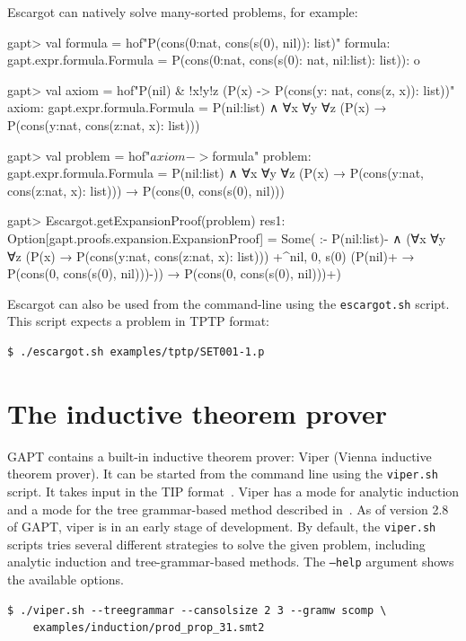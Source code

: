 \documentclass[a4paper,11pt]{book}
\newcommand{\cli}[1]{{\ttfamily {#1}}}
\begin{document}
Escargot can natively solve many-sorted problems, for example:
\begin{clilisting}
gapt> val formula = hof"P(cons(0:nat, cons(s(0), nil)): list)"
formula: gapt.expr.formula.Formula = P(cons(0:nat, cons(s(0): nat, nil:list): list)): o

gapt> val axiom = hof"P(nil) & !x!y!z (P(x) -> P(cons(y: nat, cons(z, x)): list))"
axiom: gapt.expr.formula.Formula = P(nil:list) ∧ ∀x ∀y ∀z (P(x) → P(cons(y:nat, cons(z:nat, x): list)))

gapt> val problem = hof"$axiom -> $formula"
problem: gapt.expr.formula.Formula =
P(nil:list) ∧ ∀x ∀y ∀z (P(x) → P(cons(y:nat, cons(z:nat, x): list))) →
  P(cons(0, cons(s(0), nil)))

gapt> Escargot.getExpansionProof(problem)
res1: Option[gapt.proofs.expansion.ExpansionProof] =
Some(
:-
P(nil:list)- ∧
    (∀x ∀y ∀z (P(x) → P(cons(y:nat, cons(z:nat, x): list)))
      +^{nil, 0, s(0)} (P(nil)+ → P(cons(0, cons(s(0), nil)))-)) →
  P(cons(0, cons(s(0), nil)))+)

\end{clilisting}


Escargot can also be used from the command-line using the \texttt{escargot.sh}
script.  This script expects a problem in TPTP format:
\begin{lstlisting}
$ ./escargot.sh examples/tptp/SET001-1.p
\end{lstlisting}

\section{The inductive theorem prover \cli{viper}}

GAPT contains a built-in inductive theorem prover: Viper (Vienna inductive theorem prover). It
can be started from the command line using the \texttt{viper.sh} script. It takes input in the
TIP format~\cite{Claessen15TIP}. Viper has a mode for analytic induction and a mode for 
the tree grammar-based method described in~\cite{Eberhard15Inductive}. As of version 2.8 of GAPT,
viper is in an early stage of development.  By default, the \texttt{viper.sh}
scripts tries several different strategies to solve the given problem,
including analytic induction and tree-grammar-based methods.  The
\texttt{--help} argument shows the available options.
\begin{lstlisting}
$ ./viper.sh --treegrammar --cansolsize 2 3 --gramw scomp \
    examples/induction/prod_prop_31.smt2
\end{lstlisting}
\end{document}
